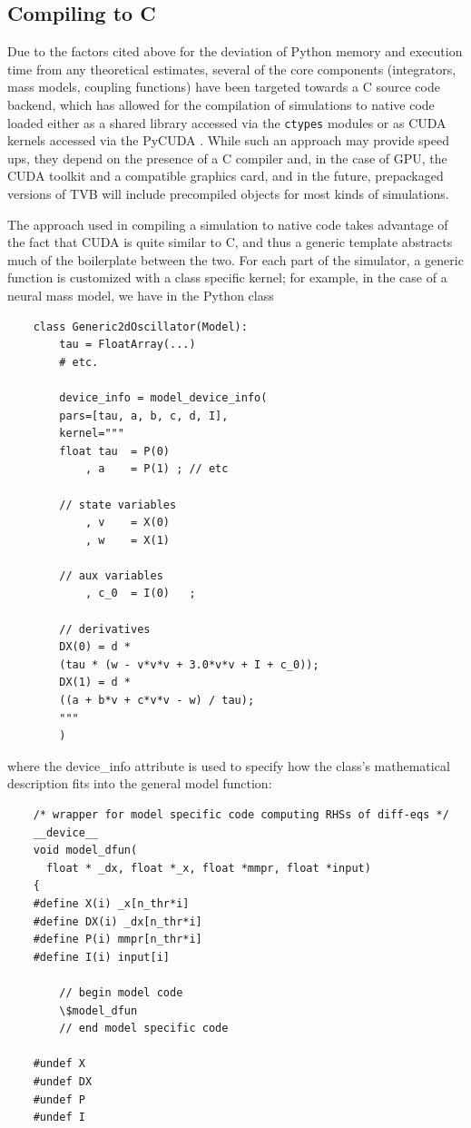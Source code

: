 
\subsection{Compiling to C}

	Due to the factors cited above for the deviation of Python memory
	and execution time from any theoretical estimates, 
	several of the core components (integrators, mass models, coupling
	functions) have been targeted towards a C source code backend, which has
	allowed for the compilation of simulations to native code loaded 
	either as a shared library accessed via the \texttt{ctypes} modules
	or as CUDA kernels accessed via the PyCUDA \cite{PyCUDA}.
	While such an approach may provide speed ups, they depend on the
	presence of a C compiler and, in the case of GPU, the CUDA toolkit and
	a compatible graphics card, and in the future, prepackaged versions of TVB
	will include precompiled objects for most kinds of simulations. 

	The approach used in compiling a simulation to native code takes advantage
	of the fact that CUDA is quite similar to C, and thus a generic template
	abstracts much of the boilerplate between the two. For each part of the 
	simulator, a generic function is customized with a class specific kernel;
	for example, in the case of a neural mass model, we have in the Python class

	\begin{lstlisting}
	class Generic2dOscillator(Model):
	    tau = FloatArray(...)
	    # etc.

	    device_info = model_device_info(
		pars=[tau, a, b, c, d, I],
		kernel="""
		float tau  = P(0)
		    , a    = P(1) ; // etc

		// state variables
		    , v    = X(0)
		    , w    = X(1)

		// aux variables
		    , c_0  = I(0)   ;

		// derivatives
		DX(0) = d * 
		(tau * (w - v*v*v + 3.0*v*v + I + c_0));
		DX(1) = d * 
		((a + b*v + c*v*v - w) / tau);
		"""
	    )
	\end{lstlisting}

	\noindent where the device\_info attribute is used to specify how the
	class's mathematical description fits into the general model function:

	\begin{lstlisting}
	/* wrapper for model specific code computing RHSs of diff-eqs */
	__device__
	void model_dfun(
	  float * _dx, float *_x, float *mmpr, float *input)
	{
	#define X(i) _x[n_thr*i]
	#define DX(i) _dx[n_thr*i]
	#define P(i) mmpr[n_thr*i]
	#define I(i) input[i]

	    // begin model code
	    \$model_dfun
	    // end model specific code

	#undef X
	#undef DX
	#undef P
	#undef I
	\end{lstlisting}

